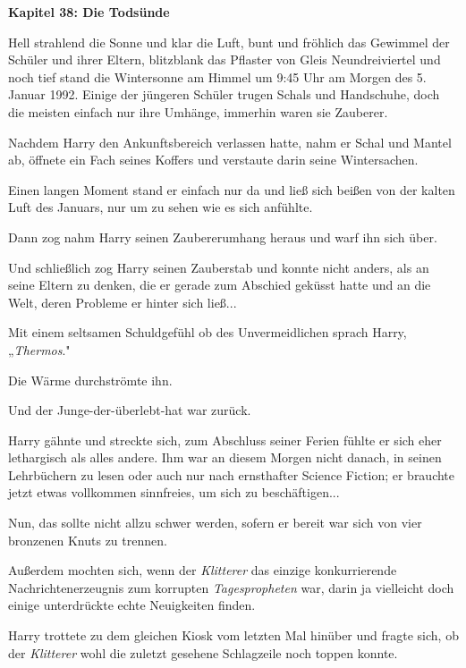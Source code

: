 

\hypertarget{die-todsuxfcnde}{%

\textbf{Kapitel 38: Die Todsünde}

Hell strahlend die Sonne und klar die Luft, bunt und fröhlich das Gewimmel der Schüler und ihrer Eltern, blitzblank das Pflaster von Gleis Neundreiviertel und noch tief stand die Wintersonne am Himmel um 9:45 Uhr am Morgen des 5. Januar 1992. Einige der jüngeren Schüler trugen Schals und Handschuhe, doch die meisten einfach nur ihre Umhänge, immerhin waren sie Zauberer.

Nachdem Harry den Ankunftsbereich verlassen hatte, nahm er Schal und Mantel ab, öffnete ein Fach seines Koffers und verstaute darin seine Wintersachen.

Einen langen Moment stand er einfach nur da und ließ sich beißen von der kalten Luft des Januars, nur um zu sehen wie es sich anfühlte.

Dann zog nahm Harry seinen Zaubererumhang heraus und warf ihn sich über.

Und schließlich zog Harry seinen Zauberstab und konnte nicht anders, als an seine Eltern zu denken, die er gerade zum Abschied geküsst hatte und an die Welt, deren Probleme er hinter sich ließ...

Mit einem seltsamen Schuldgefühl ob des Unvermeidlichen sprach Harry, „\emph{Thermos}."

Die Wärme durchströmte ihn.

Und der Junge-der-überlebt-hat war zurück.

Harry gähnte und streckte sich, zum Abschluss seiner Ferien fühlte er sich eher lethargisch als alles andere. Ihm war an diesem Morgen nicht danach, in seinen Lehrbüchern zu lesen oder auch nur nach ernsthafter Science Fiction; er brauchte jetzt etwas vollkommen sinnfreies, um sich zu beschäftigen...

Nun, das sollte nicht allzu schwer werden, sofern er bereit war sich von vier bronzenen Knuts zu trennen.

Außerdem mochten sich, wenn der \emph{Klitterer} das einzige konkurrierende Nachrichtenerzeugnis zum korrupten \emph{Tagespropheten} war, darin ja vielleicht doch einige unterdrückte echte Neuigkeiten finden.

Harry trottete zu dem gleichen Kiosk vom letzten Mal hinüber und fragte sich, ob der \emph{Klitterer} wohl die zuletzt gesehene Schlagzeile noch toppen konnte.

}

